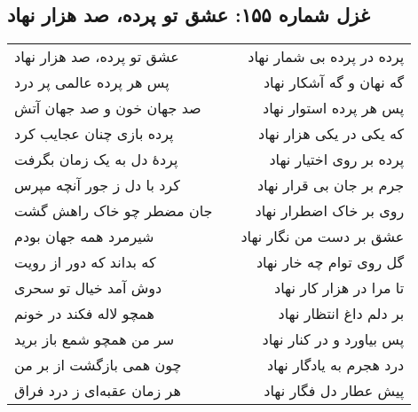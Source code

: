 \begin{center}
\section*{غزل شماره ۱۵۵: عشق تو پرده، صد هزار نهاد}
\label{sec:155}
\begin{longtable}{l p{0.5cm} r}
عشق تو پرده، صد هزار نهاد
&&
پرده در پرده بی شمار نهاد
\\
پس هر پرده عالمی پر درد
&&
گه نهان و گه آشکار نهاد
\\
صد جهان خون و صد جهان آتش
&&
پس هر پرده استوار نهاد
\\
پرده بازی چنان عجایب کرد
&&
که یکی در یکی هزار نهاد
\\
پردهٔ دل به یک زمان بگرفت
&&
پرده بر روی اختیار نهاد
\\
کرد با دل ز جور آنچه مپرس
&&
جرم بر جان بی قرار نهاد
\\
جان مضطر چو خاک راهش گشت
&&
روی بر خاک اضطرار نهاد
\\
شیرمرد همه جهان بودم
&&
عشق بر دست من نگار نهاد
\\
که بداند که دور از رویت
&&
گل روی توام چه خار نهاد
\\
دوش آمد خیال تو سحری
&&
تا مرا در هزار کار نهاد
\\
همچو لاله فکند در خونم
&&
بر دلم داغ انتظار نهاد
\\
سر من همچو شمع باز برید
&&
پس بیاورد و در کنار نهاد
\\
چون همی بازگشت از بر من
&&
درد هجرم به یادگار نهاد
\\
هر زمان عقبه‌ای ز درد فراق
&&
پیش عطار دل فگار نهاد
\\
\end{longtable}
\end{center}
